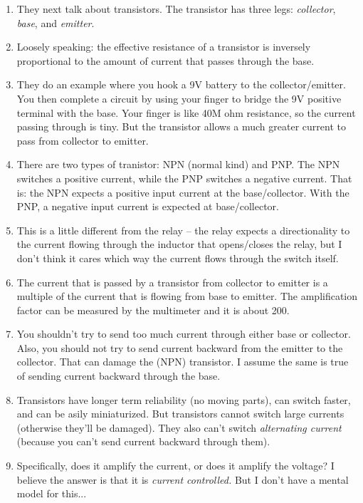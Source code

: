 \documentclass[11pt, oneside]{amsart}
\begin{document}
\begin{enumerate}
  \item They next talk about transistors. The transistor has three legs:
  \emph{collector}, \emph{base}, and \emph{emitter}.

  \item Loosely speaking: the effective resistance of a transistor is
  inversely proportional to the amount of current that passes through
  the base.

  \item They do an example where you hook a 9V battery to the
  collector/emitter. You then complete a circuit by using your finger to
  bridge the 9V positive terminal with the base. Your finger is like 40M
  ohm resistance, so the current passing through is tiny. But the
  transistor allows a much greater current to pass from collector to
  emitter.

  \item There are two types of tranistor: NPN (normal kind) and PNP. The
  NPN switches a positive current, while the PNP switches a negative
  current. That is: the NPN expects a positive input current at the
  base/collector. With the PNP, a negative input current is expected at
  base/collector.

  \item This is a little different from the relay -- the relay expects a
  directionality to the current flowing through the inductor that
  opens/closes the relay, but I don't think it cares which way the
  current flows through the switch itself.

  \item The current that is passed by a transistor from collector to
  emitter is a multiple of the current that is flowing from base to
  emitter. The amplification factor can be measured by the multimeter
  and it is about 200.

  \item You shouldn't try to send too much current through either base
  or collector. Also, you should not try to send current backward from
  the emitter to the collector. That can damage the (NPN) transistor. I
  assume the same is true of sending current backward through the base.

  \item Transistors have longer term reliability (no moving parts), can
  switch faster, and can be asily miniaturized. But transistors cannot
  switch large currents (otherwise they'll be damaged). They also can't
  switch \emph{alternating current} (because you can't send current
  backward through them).

  \item {} Specifically, does
  it amplify the current, or does it amplify the voltage? I believe the
  answer is that it is \emph{current controlled.} But I don't have a
  mental model for this...
\end{enumerate}
\end{document}
